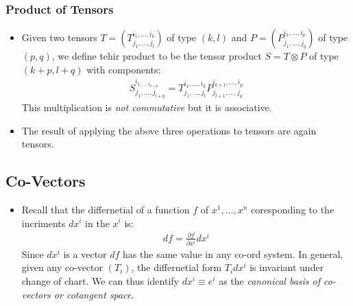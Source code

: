 \documentclass[11pt]{article}
\numberwithin{equation}{section}
\begin{document}
\subsubsection{Product of Tensors}
\begin{itemize}
  \item Given two tensors $T = \left(T^{i_1,\ldots,i_k}_{j_1,\ldots,j_l}\right)$ of type $(k,l)$ and $P = \left(P^{i_1,\ldots,i_p}_{j_1,\ldots,j_q}\right)$ of type $(p,q)$, we define tehir product to be the tensor product $S = T \otimes P$ of type $(k+p,l+q)$ with components:
  \begin{align*}
    S^{i_{1,\ldots,i_{k+p}}}_{j_1,\ldots,j_{l+q}} = T^{i_1,\ldots,i_k}_{j_1,\ldots,j_l}P^{i_{k+1},\ldots,i_p}_{j_{l+1},\ldots,j_q}
  \end{align*}
  This multiplication is \emph{not commutative} but it is associative. 

\item The result of applying the above three operations to tensors are again tensors. 
\end{itemize}

\subsection{Co-Vectors}
\begin{itemize}
  \item Recall that the differnetial of a function $f$ of $x^{1},\ldots,x^n$ coresponding to the incriments $dx^i$ in the $x^i$ is:
  \begin{align*}
    df = \frac{\partial f}{\partial x^i}dx^i
  \end{align*}
  Since $dx^i$ is a vector $df$ has the same value in any co-ord system. 
  In general, given any co-vector $(T_i)$, the differnetial form $T_idx^i$ is invariant under change of chart. We can thus identify $dx^i \equiv e^{i}$ as the \emph{canonical basis of co-vectors or cotangent space}. 
\end{itemize}
\end{document}
